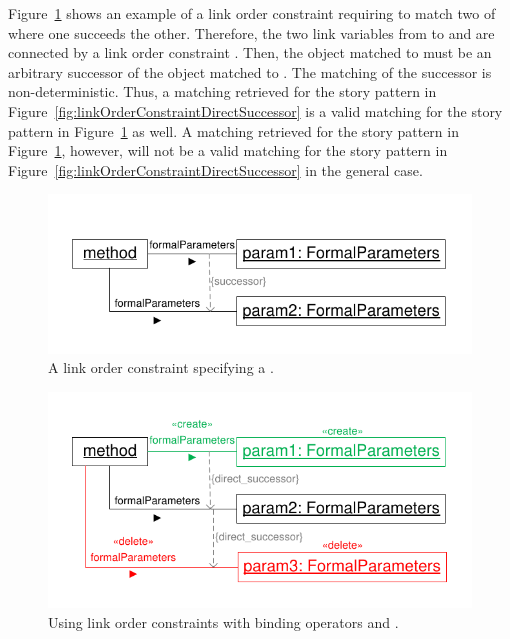 {Figure~\ref{fig:linkOrderConstraintSuccessor} shows an example of a link order constraint requiring to match two  of  where one succeeds the other. Therefore, the two link variables from  to  and  are connected by a link order constraint . Then, the object matched to  must be an arbitrary successor of the object matched to . The matching of the successor is non-deterministic. Thus, a matching retrieved for the story pattern in Figure~\ref{fig:linkOrderConstraintDirectSuccessor} is a valid matching for the story pattern in Figure~\ref{fig:linkOrderConstraintSuccessor} as well. A matching retrieved for the story pattern in Figure~\ref{fig:linkOrderConstraintSuccessor}, however, will not be a valid matching for the story pattern in Figure~\ref{fig:linkOrderConstraintDirectSuccessor} in the general case.

\begin{figure}[htbp]
\center
\includegraphics[width=0.75\columnwidth]{figures/LinkOrderConstraintSuccessor}
\caption{A link order constraint specifying a .}
\label{fig:linkOrderConstraintSuccessor}
\end{figure}


\begin{figure}[htbp]
\center
\includegraphics[width=0.75\columnwidth]{figures/LinkOrderConstraintDirectSuccessorCreateDelete}
\caption{Using link order constraints with binding operators \create and \destroy.}
\label{fig:linkOrderConstraintDirectSuccessorCreateDelete}
\end{figure}

}
